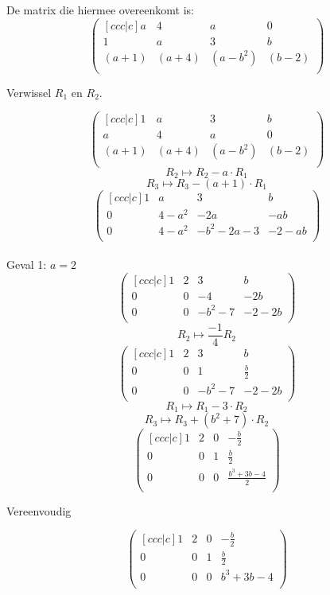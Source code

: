 \documentclass[lineaire_algebra_oplossingen.tex]{subfiles}
\begin{document}
De matrix die hiermee overeenkomt is:
\[
\begin{pmatrix}[ccc|c]
a & 4 & a & 0\\
1 & a & 3 & b\\
(a+1) & (a+4) & (a-b^{2}) & (b-2)\\
\end{pmatrix}
\]
\begin{center}
Verwissel $R_1$ en $R_2$.
\end{center}
\[
\begin{pmatrix}[ccc|c]
1 & a & 3 & b\\
a & 4 & a & 0\\
(a+1) & (a+4) & (a-b^{2}) & (b-2)\\
\end{pmatrix}
\]
\[ R_2 \longmapsto R_2 - a\cdot R_1 \]
\[ R_3 \longmapsto R_3 - (a+1)\cdot R_1 \]
\[
\begin{pmatrix}[ccc|c]
1 & a & 3 & b\\
0 & 4-a^{2} & -2a & -ab\\
0 & 4-a^{2} & -b^{2}-2a-3 & -2-ab\\
\end{pmatrix}
\]
\\Geval 1: $a=2$
\[
\begin{pmatrix}[ccc|c]
1 & 2 & 3 & b\\
0 & 0 & -4 & -2b\\
0 & 0 & -b^{2}-7 & -2-2b\\
\end{pmatrix}
\]
\[ R_2 \longmapsto \frac{-1}{4}R_2 \]
\[
\begin{pmatrix}[ccc|c]
1 & 2 & 3 & b\\
0 & 0 & 1 & \frac{b}{2}\\
0 & 0 & -b^{2}-7 & -2-2b\\
\end{pmatrix}
\]
\[ R_1 \longmapsto R_1 - 3\cdot R_2 \]
\[ R_3 \longmapsto R_3 + (b^{2}+7)\cdot R_2 \]
\[
\begin{pmatrix}[ccc|c]
1 & 2 & 0 & -\frac{b}{2}\\
0 & 0 & 1 & \frac{b}{2}\\
0 & 0 & 0 & \frac{b^{3}+3b-4}{2}\\
\end{pmatrix}
\]
\begin{center}
Vereenvoudig
\end{center}
\[
\begin{pmatrix}[ccc|c]
1 & 2 & 0 & -\frac{b}{2}\\
0 & 0 & 1 & \frac{b}{2}\\
0 & 0 & 0 & b^{3}+3b-4\\
\end{pmatrix}
\]
\end{document}
